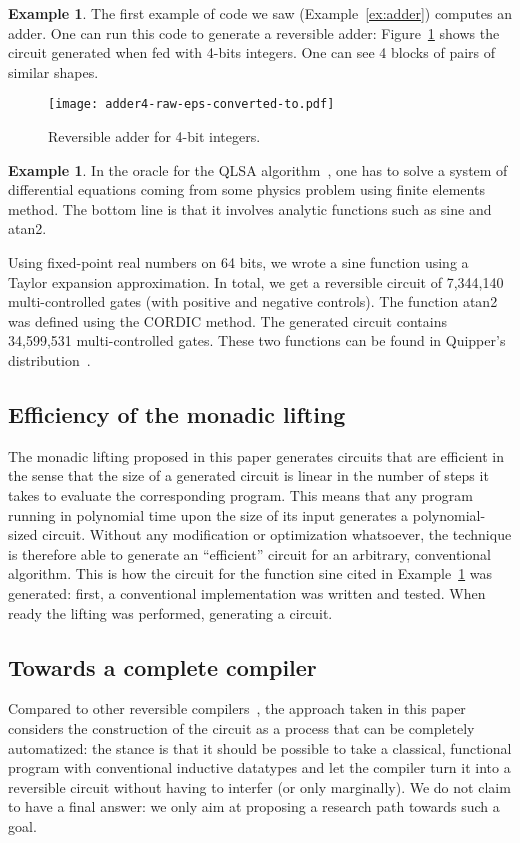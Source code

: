 \documentclass{article}
\theoremstyle{plain}
\theoremstyle{definition}
\newtheorem{example}[theorem]{Example}
\begin{document}
\begin{example}\label{ex:addercircuit}
  The first example of code we saw (Example~\ref{ex:adder}) computes
  an adder. One can run this code to generate a reversible adder:
  Figure~\ref{fig:adder-4-raw} shows the circuit generated when fed
  with 4-bits integers. One can see 4 blocks of pairs of
  similar shapes. 
\begin{figure}[tb]
  \centering
  \texttt{[image: adder4-raw-eps-converted-to.pdf]}
  \caption{Reversible adder for 4-bit integers.}
  \label{fig:adder-4-raw}
\end{figure}
\end{example}
\begin{example}\label{ex:sin}
  In the oracle for the QLSA algorithm~\cite{QLSA,QLSAnous}, one has to solve a
  system of differential equations coming from some physics problem
  using finite elements method. The bottom line is that it involves
  analytic functions such as sine and atan2.

  Using fixed-point real numbers on 64 bits, we wrote a sine function
  using a Taylor expansion approximation. In total, we get a
  reversible circuit of 7,344,140 multi-controlled gates (with
  positive and negative controls). The function atan2 was defined
  using the CORDIC method. The generated circuit contains 34,599,531
  multi-controlled gates. These two functions can be found in
  Quipper's distribution~\cite{Quipper}.
\end{example}



\subsection{Efficiency of the monadic lifting}
The monadic lifting proposed in this paper generates circuits that are
efficient in the sense that the size of a generated circuit is linear
in the number of steps it takes to evaluate the corresponding
program. This means that any program running in polynomial time upon
the size of its input generates a polynomial-sized circuit. Without
any modification or optimization whatsoever, the technique is
therefore able to generate an ``efficient'' circuit for an arbitrary,
conventional algorithm. This is how the circuit for the function sine
cited in Example~\ref{ex:sin} was generated: first, a conventional
implementation was written and tested. When ready the lifting was
performed, generating a circuit.


\subsection{Towards a complete compiler}
Compared to other reversible compilers~\cite{revs}, the approach taken
in this paper considers the construction of the circuit as a process
that can be completely automatized: the stance is that it should be
possible to take a classical, functional program with conventional
inductive datatypes and let the compiler turn it into a reversible
circuit without having to interfer (or only marginally). We do not
claim to have a final answer: we only aim at proposing a research path
towards such a goal.
\end{document}
